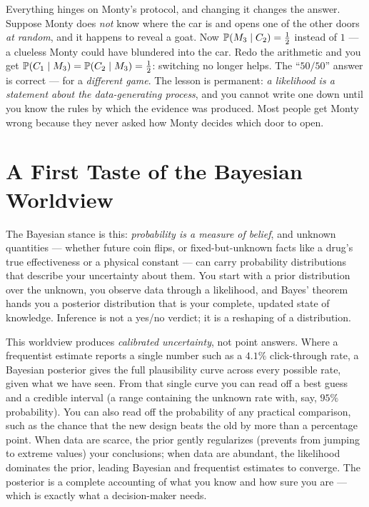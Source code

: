 \begin{trapbox}
Everything hinges on Monty's protocol, and changing it changes the answer. Suppose Monty
does \emph{not} know where the car is and opens one of the other doors \emph{at random},
and it happens to reveal a goat. Now $\operatorname{\mathbb{P}}(M_3\mid C_2)=\tfrac12$ instead of $1$ --- a
clueless Monty could have blundered into the car. Redo the arithmetic and you get
$\operatorname{\mathbb{P}}(C_1\mid M_3) = \operatorname{\mathbb{P}}(C_2 \mid M_3) = \tfrac12$: switching no longer helps. The
``$50/50$'' answer is correct --- for a \emph{different game}. The lesson is permanent:
\emph{a likelihood is a statement about the data-generating process}, and you cannot write
one down until you know the rules by which the evidence was produced. Most people get
Monty wrong because they never asked how Monty decides which door to open.
\end{trapbox}

\section{A First Taste of the Bayesian Worldview}
\label{ch05:worldview}

The Bayesian stance is this: \emph{probability is a measure of belief}, and
unknown quantities --- whether future coin flips, or fixed-but-unknown facts like a drug's true
effectiveness or a physical constant --- can carry probability distributions that describe
your uncertainty about them. You start with a prior distribution over the unknown, you
observe data through a likelihood, and Bayes' theorem hands you a posterior distribution
that is your complete, updated state of knowledge. Inference is not a yes/no verdict; it
is a reshaping of a distribution.

\begin{aestheticbox}
This worldview produces \emph{calibrated uncertainty}, not point answers. Where a frequentist
estimate reports a single number such as a $4.1\%$ click-through rate, a Bayesian posterior
gives the full plausibility curve across every possible rate, given what we have seen. From
that single curve you can read off a best guess and a credible interval (a range containing
the unknown rate with, say, $95\%$ probability). You can also read off the probability of
any practical comparison, such as the chance that the new design beats the old by more than
a percentage point. When data are scarce, the prior gently regularizes (prevents from jumping to extreme values) your conclusions; when data
are abundant, the likelihood dominates the prior, leading Bayesian and frequentist estimates
to converge. The posterior is a complete accounting of what you know and how sure you are ---
which is exactly what a decision-maker needs.
\end{aestheticbox}

